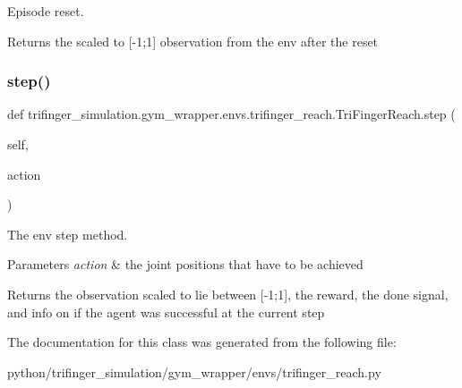 Episode reset. 

\begin{DoxyReturn}{Returns}
the scaled to \mbox{[}-\/1;1\mbox{]} observation from the env after the reset 
\end{DoxyReturn}
\mbox{\label{classtrifinger__simulation_1_1gym__wrapper_1_1envs_1_1trifinger__reach_1_1TriFingerReach_a949ff008d719543f6146d276698bd9f1}} 
\subsubsection{\texorpdfstring{step()}{step()}}
{\footnotesize\ttfamily def trifinger\+\_\+simulation.\+gym\+\_\+wrapper.\+envs.\+trifinger\+\_\+reach.\+Tri\+Finger\+Reach.\+step (\begin{DoxyParamCaption}\item[{}]{self,  }\item[{}]{action }\end{DoxyParamCaption})}



The env step method. 


\begin{DoxyParams}{Parameters}
{\em action} & the joint positions that have to be achieved\\
\hline
\end{DoxyParams}
\begin{DoxyReturn}{Returns}
the observation scaled to lie between \mbox{[}-\/1;1\mbox{]}, the reward, the done signal, and info on if the agent was successful at the current step 
\end{DoxyReturn}


The documentation for this class was generated from the following file\+:\begin{DoxyCompactItemize}
\item 
python/trifinger\+\_\+simulation/gym\+\_\+wrapper/envs/trifinger\+\_\+reach.\+py\end{DoxyCompactItemize}
